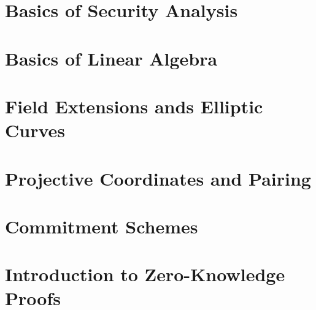 \documentclass{zkdl-template}
\begin{document}


\section{Basics of Security Analysis}\label{section:math-crypto-2}



\section{Basics of Linear Algebra}\label{section:linear-algebra}



\section{Field Extensions ands Elliptic Curves}\label{section:field_extensions}



\section{Projective Coordinates and Pairing}



\section{Commitment Schemes}\label{section:commitments}



\section{Introduction to Zero-Knowledge Proofs}\label{section:intro-zk}




% 

\end{document}
